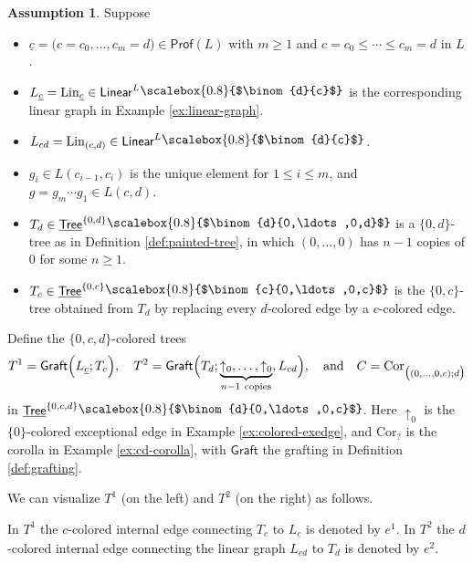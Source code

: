 \documentclass{amsbook}
\numberwithin{section}{chapter}
\numberwithin{subsection}{section}
\numberwithin{equation}{section}
\theoremstyle{plain}
\theoremstyle{definition}
\newtheorem{assumption}[equation]{Assumption}
\newcommand{\Cor}{\mathrm{Cor}}
\newcommand{\graft}{\mathsf{Graft}}
\newcommand{\Lin}{\mathrm{Lin}}
\newcommand{\Prof}{\mathsf{Prof}}
\newcommand{\profl}{\Prof(L)}
\newcommand{\zeroc}{\{0,c\}}
\newcommand{\zerod}{\{0,d\}}
\newcommand{\zerocd}{\{0,c,d\}}
\newcommand{\Linear}{\mathsf{Linear}}
\newcommand{\Tree}{\mathsf{Tree}}
\newcommand{\uTree}{\underline{\Tree}}
\newcommand{\uTreezeroc}{\uTree^{\zeroc}}
\newcommand{\uTreezerod}{\uTree^{\zerod}}
\newcommand{\uTreezerocd}{\uTree^{\zerocd}}
\newcommand{\uc}{\underline c}
\newcommand{\smallprof}[1]
{\raisebox{.05cm}{\scalebox{0.8}{#1}}}
\newcommand{\czerozeroc}{\smallprof{$\binom{c}{0,\ldots,0,c}$}}
\newcommand{\dc}{\smallprof{$\binom{d}{c}$}}
\newcommand{\dzerozeroc}{\smallprof{$\binom{d}{0,\ldots,0,c}$}}
\newcommand{\dzerozerod}{\smallprof{$\binom{d}{0,\ldots,0,d}$}}
\newcommand{\andspace}{\quad\text{and}\quad}
\begin{document}
\begin{assumption}\label{assumption:hpa-hcdiag-mod}
Suppose 
\begin{itemize}\item $\uc = \bigl(c=c_0,\ldots,c_m=d\bigr) \in \profl$ with $m \geq 1$ and $c=c_0 \leq \cdots \leq c_m=d$ in $L$.
\item $L_{\uc}=\Lin_{\uc} \in \Linear^L\dc$ is the corresponding linear graph in Example \ref{ex:linear-graph}. 
\item $L_{cd} = \Lin_{(c,d)} \in \Linear^L \dc$.
\item $g_i \in L(c_{i-1},c_i)$ is the unique element for $1 \leq i \leq m$, and $g = g_m \cdots g_1 \in L(c,d)$.
\item $T_d \in \uTreezerod\dzerozerod$ is a $\zerod$-tree as in Definition \ref{def:painted-tree}, in which $(0,\ldots,0)$ has $n-1$ copies of $0$ for some $n \geq 1$.
\item $T_c\in \uTreezeroc\czerozeroc$ is the $\zeroc$-tree obtained from $T_d$ by replacing every $d$-colored edge by a $c$-colored edge.  
\end{itemize}
Define the $\zerocd$-colored trees
\[T^1 = \graft\Bigl(L_{\uc};T_c\Bigr), \quad 
T^2 = \graft\Bigl(T_d; \underbrace{\uparrow_0,\ldots,\uparrow_0}_{n-1~ \mathrm{copies}},L_{cd}\Bigr), \andspace C = \Cor_{\bigl((0,\ldots,0,c);d\bigr)}\]
in $\uTreezerocd\dzerozeroc$.  Here $\uparrow_0$ is the $\{0\}$-colored exceptional edge in Example \ref{ex:colored-exedge}, and $\Cor_?$ is the corolla in Example \ref{ex:cd-corolla}, with $\graft$ the grafting in Definition \ref{def:grafting}.  

We can visualize $T^1$ (on the left) and $T^2$ (on the right) as follows.
\begin{center}
\end{center}
In $T^1$ the $c$-colored internal edge connecting $T_c$ to $L_{\uc}$ is denoted by $e^1$.  In $T^2$ the $d$-colored internal edge connecting the linear graph $L_{cd}$ to $T_d$ is denoted by $e^2$.


\end{assumption}
\end{document}
